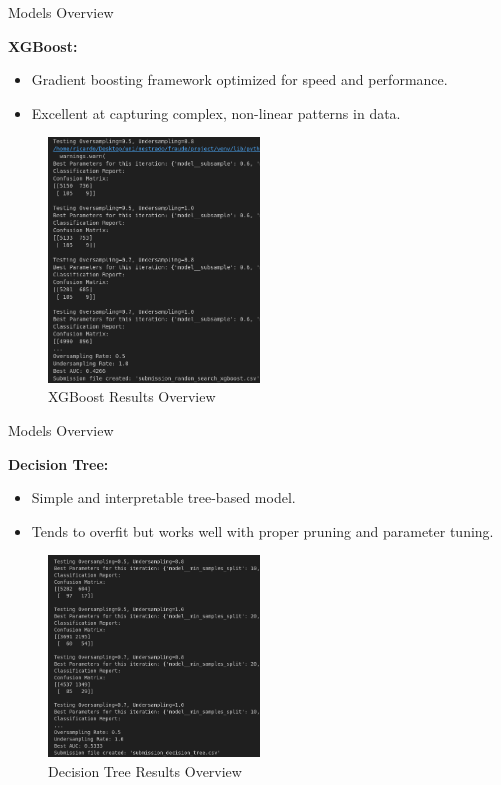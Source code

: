 \documentclass{beamer}
\begin{document}
\begin{frame}{Models Overview}
        \item \textbf{XGBoost:}
        \begin{itemize}
            \item Gradient boosting framework optimized for speed and performance.
            \item Excellent at capturing complex, non-linear patterns in data.
        \end{itemize}
    \begin{figure}
        \centering
        \includegraphics[width=0.5\textwidth]{images/xgb.png} %
        \caption{XGBoost Results Overview}
    \end{figure}
\end{frame}

\begin{frame}{Models Overview}
        \item \textbf{Decision Tree:}
        \begin{itemize}
            \item Simple and interpretable tree-based model.
            \item Tends to overfit but works well with proper pruning and parameter tuning.
        \end{itemize}
    \begin{figure}
        \centering
        \includegraphics[width=0.5\textwidth]{images/dt.png} %
        \caption{Decision Tree Results Overview}
    \end{figure}
\end{frame}
\end{document}
